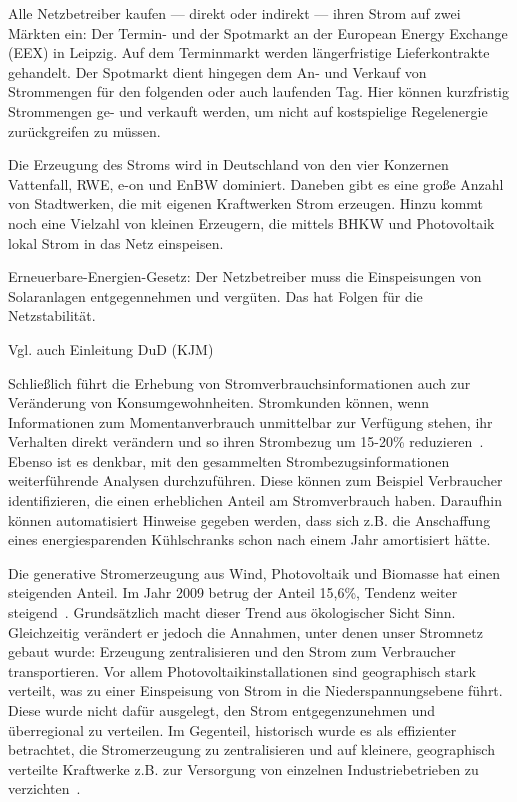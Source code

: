 \documentclass[12pt,BCOR=8.5mm]{scrartcl}
\begin{document}
\begin{enumerate}
    Alle Netzbetreiber kaufen --- direkt oder indirekt --- ihren Strom
    auf zwei Märkten ein: Der Termin- und der Spotmarkt an der European
    Energy Exchange (EEX) in Leipzig. Auf dem Terminmarkt werden
    längerfristige Lieferkontrakte gehandelt. Der Spotmarkt dient
    hingegen dem An- und Verkauf von Strommengen für den folgenden oder
    auch laufenden Tag. Hier können kurzfristig Strommengen ge- und
    verkauft werden, um nicht auf kostspielige Regelenergie
    zurückgreifen zu müssen.

    Die Erzeugung des Stroms wird in Deutschland von den vier Konzernen
    Vattenfall, RWE, e-on und EnBW dominiert. Daneben gibt es eine
    große Anzahl von Stadtwerken, die mit eigenen Kraftwerken Strom
    erzeugen. Hinzu kommt noch eine Vielzahl von kleinen Erzeugern, die
    mittels BHKW und Photovoltaik lokal Strom in das Netz einspeisen.
\end{enumerate}

Erneuerbare-Energien-Gesetz: Der Netzbetreiber muss die Einspeisungen
von Solaranlagen entgegennehmen und vergüten. Das hat Folgen für
die Netzstabilität.

Vgl. auch Einleitung DuD (KJM)

Schließlich führt die Erhebung von Stromverbrauchsinformationen auch zur
Veränderung von Konsumgewohnheiten. Stromkunden können, wenn
Informationen zum Momentanverbrauch unmittelbar zur Verfügung stehen,
ihr Verhalten direkt verändern und so ihren Strombezug um 15-20\%
reduzieren~\cite{geller2010smartgrid}. Ebenso ist es denkbar, mit den
gesammelten Strombezugsinformationen weiterführende Analysen
durchzuführen. Diese können zum Beispiel Verbraucher identifizieren, die
einen erheblichen Anteil am Stromverbrauch haben. Daraufhin können
automatisiert Hinweise gegeben werden, dass sich z.B. die Anschaffung
eines energiesparenden Kühlschranks schon nach einem Jahr amortisiert
hätte.



Die generative Stromerzeugung aus Wind, Photovoltaik und Biomasse hat
einen steigenden Anteil. Im Jahr 2009 betrug der Anteil 15,6\%, Tendenz
weiter steigend~\cite{web:bmwi-energiedaten}. Grundsätzlich macht dieser
Trend aus ökologischer Sicht Sinn. Gleichzeitig verändert er jedoch die
Annahmen, unter denen unser Stromnetz gebaut wurde: Erzeugung
zentralisieren und den Strom zum Verbraucher transportieren. Vor allem
Photovoltaikinstallationen sind geographisch stark verteilt, was zu
einer Einspeisung von Strom in die Niederspannungsebene führt. Diese
wurde nicht dafür ausgelegt, den Strom entgegenzunehmen und überregional
zu verteilen. Im Gegenteil, historisch wurde es als effizienter
betrachtet, die Stromerzeugung zu zentralisieren und auf kleinere,
geographisch verteilte Kraftwerke z.B. zur Versorgung von einzelnen
Industriebetrieben zu verzichten~\cite{carr08switch}.
\end{document}
